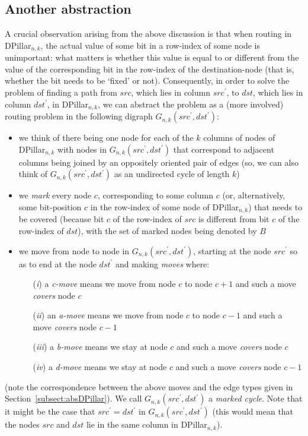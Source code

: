 \documentclass{article}
\begin{document}
\subsection{Another abstraction}

A crucial observation arising from the above discussion is that when routing in DPillar$_{n,k}$, the actual value of some bit in a row-index of some node is unimportant: what matters is whether this value is equal to or different from the value of the corresponding bit in the row-index of the destination-node (that is, whether the bit needs to be `fixed' or not). Consequently, in order to solve the problem of finding a path from $src$, which lies in column $src^\prime$, to $dst$, which lies in column $dst^\prime$, in DPillar$_{n,k}$, we can abstract the problem as a (more involved) routing problem in the following digraph $G_{n,k}(src^\prime,dst^\prime)$:
\begin{itemize}
\item we think of there being one node for each of the $k$ columns of nodes of DPillar$_{n,k}$ with nodes in $G_{n,k}(src^\prime,dst^\prime)$ that correspond to adjacent columns being joined by an oppositely oriented pair of edges (so, we can also think of $G_{n,k}(src^\prime,dst^\prime)$ as an undirected cycle of length $k$)
\item we \emph{mark\/} every node $c$, corresponding to some column $c$ (or, alternatively, some bit-position $c$ in the row-index of some node of DPillar$_{n,k}$) that needs to be covered (because bit $c$ of the row-index of $src$ is different from bit $c$ of the row-index of $dst$), with the set of marked nodes being denoted by $B$
\item we move from node to node in $G_{n,k}(src^\prime,dst^\prime)$, starting at the node $src^\prime$ so as to end at the node $dst^\prime$ and making \emph{moves\/} where:
\begin{itemize}
\item[(\emph{i\/})] a \emph{c-move\/} means we move from node $c$ to node $c+1$ and such a move \emph{covers\/} node $c$
\item[(\emph{ii\/})] an \emph{a-move\/} means we move from node $c$ to node $c-1$ and such a move \emph{covers\/} node $c-1$
\item[(\emph{iii\/})] a \emph{b-move\/} means we stay at node $c$ and such a move \emph{covers\/} node $c$
\item[(\emph{iv\/})] a \emph{d-move\/} means we stay at node $c$ and such a move \emph{covers\/} node $c-1$
\end{itemize}
\end{itemize}
(note the correspondence between the above moves and the edge types given in Section~\ref{subsect:absDPillar}). 
We call $G_{n,k}(src^\prime,dst^\prime)$ a \emph{marked cycle\/}. Note that it might be the case that $src^\prime=dst^\prime$ in $G_{n,k}(src^\prime,dst^\prime)$ (this would mean that the nodes $src$ and $dst$ lie in the same column in DPillar$_{n,k}$).
\end{document}
